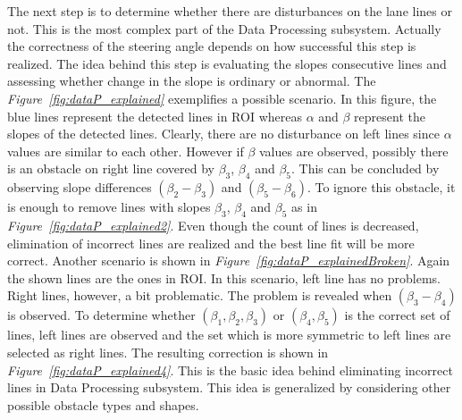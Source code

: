 \documentclass[a4paper,12pt]{article}
\begin{document}
\begin{enumerate}
	The next step is to determine whether there are disturbances on the lane lines or not. This is the most complex part of the Data Processing subsystem. Actually the correctness of the steering angle depends on how successful this step is realized. The idea behind this step is evaluating the slopes consecutive lines and assessing whether change in the slope is ordinary or abnormal. The \textit{Figure~\ref{fig:dataP_explained}} exemplifies a possible scenario. In this figure, the blue lines represent the detected lines in ROI whereas $\alpha$ and $\beta$ represent the slopes of the detected lines. Clearly, there are no disturbance on left lines since $\alpha$ values are similar to each other. However if $\beta$ values are observed, possibly there is an obstacle on right line covered by $\beta_3$, $\beta_4$ and $\beta_5$. This can be concluded by observing slope differences $(\beta_2 - \beta_3)$ and $(\beta_5 - \beta_6)$. To ignore this obstacle, it is enough to remove lines with slopes $\beta_3$, $\beta_4$ and $\beta_5$ as in \textit{Figure~\ref{fig:dataP_explained2}}. Even though the count of lines is decreased, elimination of incorrect lines are realized and the best line fit will be more correct. Another scenario is shown in \textit{Figure~\ref{fig:dataP_explainedBroken}}. Again the shown lines are the ones in ROI. In this scenario, left line has no problems. Right lines, however, a bit problematic. The problem is revealed when  $(\beta_3 - \beta_4)$ is observed. To determine whether  $(\beta_1, \beta_2, \beta_3)$ or $(\beta_4, \beta_5)$ is the correct set of lines, left lines are observed and the set which is more symmetric to left lines are selected as right lines. The resulting correction is shown in \textit{Figure~\ref{fig:dataP_explained4}}.	This is the basic idea behind eliminating incorrect lines in Data Processing subsystem. This idea is generalized by considering other possible obstacle types and shapes.


\end{enumerate}
\end{document}
